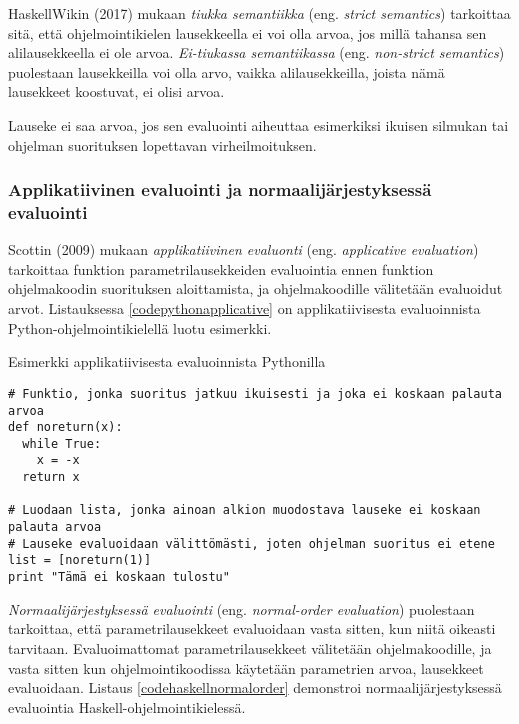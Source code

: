 HaskellWikin (2017) mukaan \textit{tiukka semantiikka} (eng. \textit{strict semantics}) tarkoittaa sitä, että ohjelmointikielen lausekkeella ei voi olla arvoa, jos millä tahansa sen alilausekkeella ei ole arvoa. \textit{Ei-tiukassa semantiikassa} (eng. \textit{non-strict semantics}) puolestaan lausekkeilla voi olla arvo, vaikka alilausekkeilla, joista nämä lausekkeet koostuvat, ei olisi arvoa.

Lauseke ei saa arvoa, jos sen evaluointi aiheuttaa esimerkiksi ikuisen silmukan tai ohjelman suorituksen lopettavan virheilmoituksen.

\subsubsection{Applikatiivinen evaluointi ja normaalijärjestyksessä evaluointi}

Scottin (2009) mukaan \textit{applikatiivinen evaluonti} (eng. \textit{applicative evaluation}) tarkoittaa funktion parametrilausekkeiden evaluointia ennen funktion ohjelmakoodin suorituksen aloittamista, ja ohjelmakoodille välitetään evaluoidut arvot. Listauksessa \ref{codepythonapplicative} on applikatiivisesta evaluoinnista Python-ohjelmointikielellä luotu esimerkki.

\begin{listing}[H]
  \caption{Esimerkki applikatiivisesta evaluoinnista Pythonilla}
  \label{codepythonapplicative}
  \bigskip
  \begin{verbatim}
# Funktio, jonka suoritus jatkuu ikuisesti ja joka ei koskaan palauta arvoa
def noreturn(x):
  while True:
    x = -x
  return x

# Luodaan lista, jonka ainoan alkion muodostava lauseke ei koskaan palauta arvoa
# Lauseke evaluoidaan välittömästi, joten ohjelman suoritus ei etene
list = [noreturn(1)]
print "Tämä ei koskaan tulostu"
  \end{verbatim}
\end{listing}

\textit{Normaalijärjestyksessä evaluointi} (eng. \textit{normal-order evaluation}) puolestaan tarkoittaa, että parametrilausekkeet evaluoidaan vasta sitten, kun niitä oikeasti tarvitaan. Evaluoimattomat parametrilausekkeet välitetään ohjelmakoodille, ja vasta sitten kun ohjelmointikoodissa käytetään parametrien arvoa, lausekkeet evaluoidaan. Listaus \ref{codehaskellnormalorder} demonstroi normaalijärjestyksessä evaluointia Haskell-ohjelmointikielessä.

